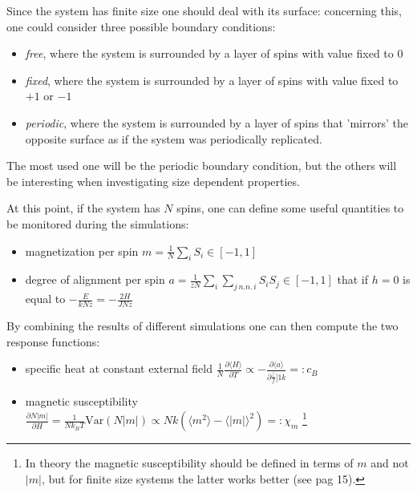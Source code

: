 \documentclass[a4paper, 11pt]{article}
\begin{document}
    Since the system has finite size one should deal with its surface: concerning this, one could consider three possible boundary conditions:
    \begin{itemize}
      \item \emph{free}, where the system is surrounded by a layer of spins with value fixed to $0$
      \item \emph{fixed}, where the system is surrounded by a layer of spins with value fixed to $+1$ or $-1$
      \item \emph{periodic}, where the system is surrounded by a layer of spins that 'mirrors' the opposite surface as if the system was periodically replicated.
    \end{itemize}
    The most used one will be the periodic boundary condition, but the others will be interesting when investigating size dependent properties.

    At this point, if the system has $N$ spins, one can define some useful quantities to be monitored during the simulations:
    \begin{itemize}
      \item magnetization per spin $m = \frac{1}{N} \sum_i S_i \in [-1, 1]$
      \item degree of alignment per spin $a = \frac{1}{zN} \sum_i \sum_{j \, n.n. \, i} S_i S_j \in [-1, 1]$ that if $h = 0$ is equal to $-\frac{E}{kNz} = -\frac{2H}{JNz}$
    \end{itemize}

    By combining the results of different simulations one can then compute the two response functions:
    \begin{itemize}
      \item specific heat at constant external field $\frac{1}{N} \frac{\partial \langle H \rangle }{\partial T} \propto -\frac{\partial \langle a \rangle }{\partial \frac[f]{1}{k}} =: c_B$
      \item magnetic susceptibility $\frac{\partial N|m|}{\partial H} = \frac{1}{Nk_BT} \text{Var}(N|m|) \propto Nk(\langle m^2 \rangle - \langle |m| \rangle^2 ) =: \chi_m$ \footnote{In theory the magnetic susceptibility should be defined in terms of $m$ and not $|m|$, but for finite size systems the latter works better (see \cite{rif:eye-opener} pag 15).}
    \end{itemize}
\end{document}
